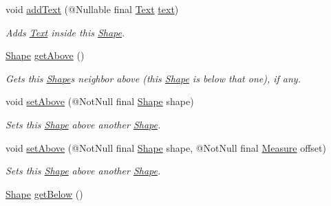 \begin{DoxyCompactItemize}
void \hyperlink{classcom_1_1aarrelaakso_1_1drawl_1_1_shape_af6fea9610721de462c18ee640043aba7}{add\+Text} (@Nullable final \hyperlink{classcom_1_1aarrelaakso_1_1drawl_1_1_text}{Text} \hyperlink{classcom_1_1aarrelaakso_1_1drawl_1_1_shape_ab54afc2d95d3447532f5ecf3fec3faa8}{text})
\begin{DoxyCompactList}\small\item\em Adds \hyperlink{classcom_1_1aarrelaakso_1_1drawl_1_1_text}{Text} inside this \hyperlink{classcom_1_1aarrelaakso_1_1drawl_1_1_shape}{Shape}. \end{DoxyCompactList}\item 
\hyperlink{classcom_1_1aarrelaakso_1_1drawl_1_1_shape}{Shape} \hyperlink{classcom_1_1aarrelaakso_1_1drawl_1_1_shape_acebea2aa57031322323c9bf50ee447db}{get\+Above} ()
\begin{DoxyCompactList}\small\item\em Gets this \hyperlink{classcom_1_1aarrelaakso_1_1drawl_1_1_shape}{Shape}\textquotesingle{}s neighbor above (this \hyperlink{classcom_1_1aarrelaakso_1_1drawl_1_1_shape}{Shape} is below that one), if any. \end{DoxyCompactList}\item 
void \hyperlink{classcom_1_1aarrelaakso_1_1drawl_1_1_shape_a4deb22d64fef2115a0bc4802e8dba682}{set\+Above} (@Not\+Null final \hyperlink{classcom_1_1aarrelaakso_1_1drawl_1_1_shape}{Shape} shape)
\begin{DoxyCompactList}\small\item\em Sets this \hyperlink{classcom_1_1aarrelaakso_1_1drawl_1_1_shape}{Shape} above another \hyperlink{classcom_1_1aarrelaakso_1_1drawl_1_1_shape}{Shape}. \end{DoxyCompactList}\item 
void \hyperlink{classcom_1_1aarrelaakso_1_1drawl_1_1_shape_aad0b2fb173c0112b71b06cf90709acc3}{set\+Above} (@Not\+Null final \hyperlink{classcom_1_1aarrelaakso_1_1drawl_1_1_shape}{Shape} shape, @Not\+Null final \hyperlink{classcom_1_1aarrelaakso_1_1drawl_1_1_measure}{Measure} offset)
\begin{DoxyCompactList}\small\item\em Sets this \hyperlink{classcom_1_1aarrelaakso_1_1drawl_1_1_shape}{Shape} above another \hyperlink{classcom_1_1aarrelaakso_1_1drawl_1_1_shape}{Shape}. \end{DoxyCompactList}\item 
\hyperlink{classcom_1_1aarrelaakso_1_1drawl_1_1_shape}{Shape} \hyperlink{classcom_1_1aarrelaakso_1_1drawl_1_1_shape_a53de5ab609d879719cd3b372dfe8df58}{get\+Below} ()

\end{DoxyCompactItemize}

